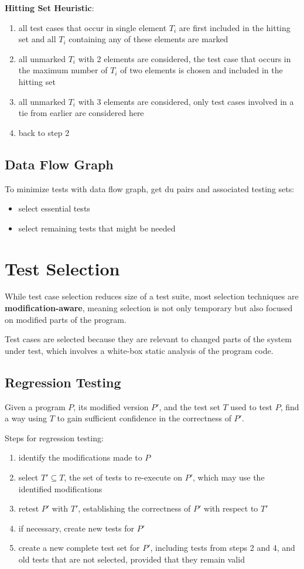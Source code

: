 \documentclass[11pt]{article}
\begin{document}
\textbf{Hitting Set Heuristic}:
\begin{enumerate}
\item all test cases that occur in single element \(T_{i}\) are first included in the hitting set
and all \(T_{i}\) containing any of these elements are marked
\item all unmarked \(T_{i}\) with 2 elements are considered, the test case that occurs in the maximum
number of \(T_{i}\) of two elements is chosen and included in the hitting set
\item all unmarked \(T_{i}\) with 3 elements are considered, only test cases involved in a tie from earlier
are considered here
\item back to step 2
\end{enumerate}
\subsection{Data Flow Graph}
\label{sec:orga999da7}
To minimize tests with data flow graph, get du pairs and associated testing sets:
\begin{itemize}
\item select essential tests
\item select remaining tests that might be needed
\end{itemize}
\section{Test Selection}
\label{sec:org4c1e970}
While test case selection reduces size of a test suite, most selection techniques are
\textbf{modification-aware}, meaning selection is not only temporary but also focused on
modified parts of the program.

Test cases are selected because they are relevant to changed parts of the system under
test, which involves a white-box static analysis of the program code.
\subsection{Regression Testing}
\label{sec:org6d3452e}
Given a program \(P\), its modified version \(P'\), and the test set \(T\) used to test \(P\),
find a way using \(T\) to gain sufficient confidence in the correctness of \(P'\).

Steps for regression testing:
\begin{enumerate}
\item identify the modifications made to \(P\)
\item select \(T' \subseteq T\), the set of tests to re-execute on \(P'\), which may use the
identified modifications
\item retest \(P'\) with \(T'\), establishing the correctness of \(P'\) with respect to \(T'\)
\item if necessary, create new tests for \(P'\)
\item create a new complete test set for \(P'\), including tests from steps 2 and 4, and old
tests that are not selected, provided that they remain valid
\end{enumerate}
\end{document}
